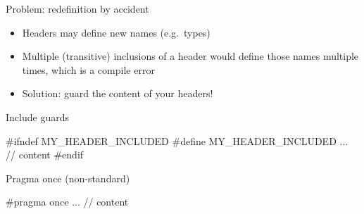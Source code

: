 \begin{frame}[fragile]
  \begin{block}{Problem: redefinition by accident}
    \begin{itemize}
      \item Headers may define new names (e.g.\ types)
      \item Multiple (transitive) inclusions of a header would define those names multiple times, which is a compile error
      \item Solution: guard the content of your headers!
    \end{itemize}
  \end{block}
  \begin{block}{Include guards}
    \begin{cppcode*}{}
      #ifndef MY_HEADER_INCLUDED
      #define MY_HEADER_INCLUDED
      ... // content
      #endif
    \end{cppcode*}
  \end{block}
  \begin{block}{Pragma once (non-standard)}
    \begin{cppcode*}{}
      #pragma once
      ... // content
    \end{cppcode*}
  \end{block}
\end{frame}
